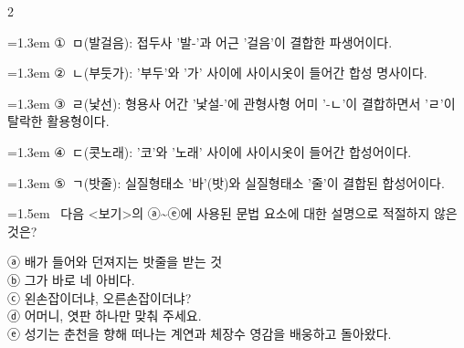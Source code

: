 \documentclass[10pt, a4paper]{article}
\begin{document}
\begin{multicols}{2}
\begin{minipage}{\columnwidth}
\vspace{0.5mm}
{\hangindent=1.3em  \noindent\hspace{0.3em}①~ㅁ(발걸음): 접두사 '발-'과 어근 '걸음'이 결합한 파생어이다.\par}
{\hangindent=1.3em  \noindent\hspace{0.3em}②~ㄴ(부둣가): '부두'와 '가' 사이에 사이시옷이 들어간 합성 명사이다.\par}
{\hangindent=1.3em  \noindent\hspace{0.3em}③~ㄹ(낯선): 형용사 어간 '낯설-'에 관형사형 어미 '-ㄴ'이 결합하면서 'ㄹ'이 탈락한 활용형이다.\par}
{\hangindent=1.3em  \noindent\hspace{0.3em}④~ㄷ(콧노래): '코'와 '노래' 사이에 사이시옷이 들어간 합성어이다.\par}
{\hangindent=1.3em  \noindent\hspace{0.3em}⑤~ㄱ(밧줄): 실질형태소 '바'(밧)와 실질형태소 '줄'이 결합된 합성어이다.\par}
\vspace{4mm}
\end{minipage}
\par

\noindent\begin{minipage}{\columnwidth}
\vspace{2mm}
{\hangindent=1.5em  ~다음 <보기>의 ⓐ\textasciitilde{}ⓔ에 사용된 문법 요소에 대한 설명으로 적절하지 않은 것은?\par}

\vspace{1mm}
\begin{boxibox}
ⓐ 배가 들어와 던져지는 밧줄을 받는 것 \\
ⓑ 그가 바로 네 아비다. \\
ⓒ 왼손잡이더냐, 오른손잡이더냐? \\
ⓓ 어머니, 엿판 하나만 맞춰 주세요. \\
ⓔ 성기는 춘천을 향해 떠나는 계연과 체장수 영감을 배웅하고 돌아왔다. \\
\end{boxibox}
\vspace{1mm}


\end{minipage}
\end{multicols}
\end{document}
